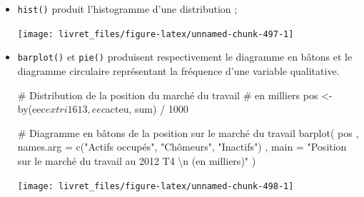 \documentclass[12pt,twosided, notitlepage]{book}
\newenvironment{Shaded}{}{}
\newcommand{\KeywordTok}[1]{\textcolor[rgb]{0.00,0.00,1.00}{{#1}}}
\newcommand{\DataTypeTok}[1]{{#1}}
\newcommand{\DecValTok}[1]{{#1}}
\newcommand{\CharTok}[1]{\textcolor[rgb]{0.00,0.50,0.50}{{#1}}}
\newcommand{\StringTok}[1]{\textcolor[rgb]{0.00,0.50,0.50}{{#1}}}
\newcommand{\CommentTok}[1]{\textcolor[rgb]{0.00,0.50,0.00}{{#1}}}
\newcommand{\NormalTok}[1]{{#1}}
\renewenvironment{Shaded}{\begin{snugshade}}{\end{snugshade}}
\begin{document}
\begin{itemize}
\item
  \texttt{hist()} produit l'histogramme
  d'une distribution ;

\begin{Shaded}
\end{Shaded}

  \begin{center}\texttt{[image: livret\_files/figure-latex/unnamed-chunk-497-1]} \end{center}
\item
  \texttt{barplot()} et
  \texttt{pie()} produisent respectivement le
  diagramme en bâtons et le diagramme circulaire représentant la
  fréquence d'une variable qualitative.

\begin{Shaded}
\begin{Highlighting}[]
\CommentTok{# Distribution de la position du marché du travail}
\CommentTok{# en milliers}
\NormalTok{pos <-}\StringTok{ }\KeywordTok{by}\NormalTok{(eec$extri1613, eec$acteu, sum) /}\StringTok{ }\DecValTok{1000}

\CommentTok{# Diagramme en bâtons de la position sur le marché du travail}
\KeywordTok{barplot}\NormalTok{(}
  \NormalTok{pos}
  \NormalTok{, }\DataTypeTok{names.arg =} \KeywordTok{c}\NormalTok{(}\StringTok{"Actifs occupés"}\NormalTok{, }\StringTok{"Chômeurs"}\NormalTok{, }\StringTok{"Inactifs"}\NormalTok{)}
  \NormalTok{, }\DataTypeTok{main =} \StringTok{"Position sur le marché du travail au 2012 T4 }\CharTok{\textbackslash{}n}\StringTok{ (en milliers)"}
\NormalTok{)}
\end{Highlighting}
\end{Shaded}

  \begin{center}\texttt{[image: livret\_files/figure-latex/unnamed-chunk-498-1]} \end{center}

\begin{Shaded}
\begin{Highlighting}[]


\end{Highlighting}
\end{Shaded}
\end{itemize}
\end{document}
